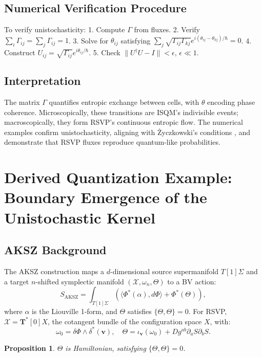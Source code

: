 \documentclass[12pt]{article}
\newtheorem{proposition}{Proposition}
\begin{document}
\subsection{Numerical Verification Procedure}

To verify unistochasticity:
1. Compute \(\Gamma\) from fluxes.
2. Verify \(\sum_i \Gamma_{ij} = \sum_j \Gamma_{ij} = 1\).
3. Solve for \(\theta_{ij}\) satisfying \(\sum_j \sqrt{\Gamma_{ij} \Gamma_{kj}} e^{i (\theta_{ij} - \theta_{kj}) / \hbar} = 0\).
4. Construct \(U_{ij} = \sqrt{\Gamma_{ij}} e^{i \theta_{ij} / \hbar}\).
5. Check \(\|U^\dagger U - I\| < \epsilon\), \(\epsilon \ll 1\).

\subsection{Interpretation}

The matrix \(\Gamma\) quantifies entropic exchange between cells, with \(\theta\) encoding phase coherence. Microscopically, these transitions are ISQM’s indivisible events; macroscopically, they form RSVP’s continuous entropic flow. The numerical examples confirm unistochasticity, aligning with Życzkowski’s conditions \cite{Zyczkowski1994}, and demonstrate that RSVP fluxes reproduce quantum-like probabilities.

\section{Derived Quantization Example: Boundary Emergence of the Unistochastic Kernel}

\subsection{AKSZ Background}

The AKSZ construction maps a \(d\)-dimensional source supermanifold \(T[1]\Sigma\) and a target \(n\)-shifted symplectic manifold \((\mathcal{X}, \omega_n, \Theta)\) to a BV action:
\[
S_{\mathrm{AKSZ}} = \int_{T[1]\Sigma} \left( \langle \Phi^*(\alpha), d\Phi \rangle + \Phi^*(\Theta) \right),
\]
where \(\alpha\) is the Liouville 1-form, and \(\Theta\) satisfies \(\{\Theta, \Theta\} = 0\). For RSVP, \(\mathcal{X} = \mathbf{T}^*[0]X\), the cotangent bundle of the configuration space \(X\), with:
\[
\omega_0 = \delta \Phi \wedge \delta^* (\mathbf{v}), \quad \Theta = \iota_{\mathbf{v}}(\omega_0) + D g^{ab} \partial_a S \partial_b S.
\]

\begin{proposition}
\label{prop:aks}
\(\Theta\) is Hamiltonian, satisfying \(\{\Theta, \Theta\} = 0\).
\end{proposition}
\end{document}

